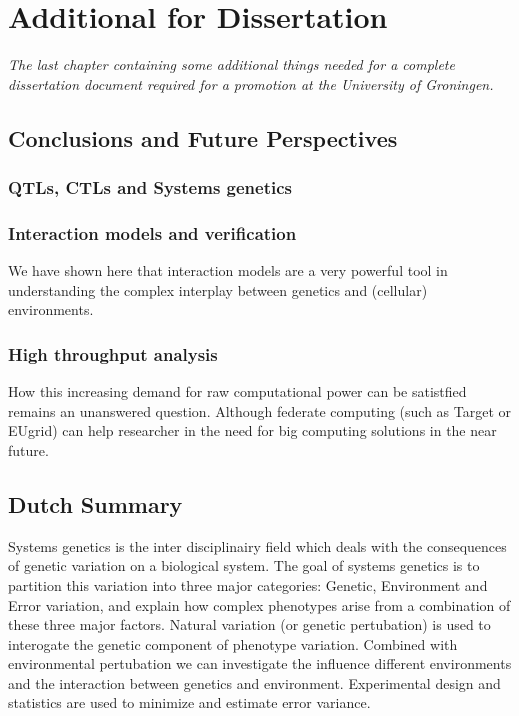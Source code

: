 \chapter{Additional for Dissertation}
\thispagestyle{empty}
\emph{The last chapter containing some additional things needed for a complete 
dissertation document required for a promotion at the University of Groningen.}
\null
\vfill

\newpage

\section*{Conclusions and Future Perspectives}
\lipsum[1]
\subsection{QTLs, CTLs and Systems genetics}
\lipsum[1]
\subsection{Interaction models and verification}
We have shown here that interaction models are a very powerful tool in understanding the complex 
interplay between genetics and (cellular) environments.
\subsection{High throughput analysis}
How this increasing demand for raw computational power can be satistfied remains an unanswered 
question. Although federate computing (such as Target or EUgrid) can help researcher in the need 
for big computing solutions in the near future.

\newpage

\section*{Dutch Summary}
Systems genetics is the inter disciplinairy field which deals with the consequences of genetic 
variation on a biological system. The goal of systems genetics is to partition this variation 
into three major categories: Genetic, Environment and Error variation, and explain how complex
phenotypes arise from a combination of these three major factors.  Natural variation (or 
genetic pertubation) is used to interogate the genetic component of phenotype variation. 
Combined with environmental pertubation we can investigate the influence different 
environments and the interaction between genetics and environment. Experimental design and 
statistics are used to minimize and estimate error variance.

